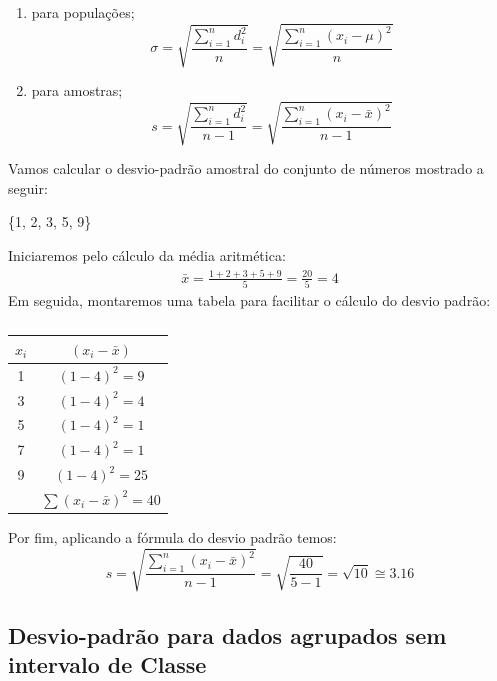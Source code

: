 \begin{enumerate}[label=\alph*.]
    \item para populações;
\[
\sigma=\sqrt{\frac{\sum_{i=1}^{n}d_i^2}{n}}
=\sqrt{\frac{\sum_{i=1}^{n}(x_i-\mu)^2}{n}}
\]
    \item para amostras;
\[
s=\sqrt{\frac{\sum_{i=1}^{n}d_i^2}{n-1}}
=\sqrt{\frac{\sum_{i=1}^{n}(x_i-\bar{x})^2}{n-1}}
\]
\end{enumerate}

\begin{example}
    Vamos calcular o desvio-padrão amostral do conjunto de números mostrado a seguir:
    \begin{center}
        \{1, 2, 3, 5, 9\}
    \end{center}
    Iniciaremos pelo cálculo da média aritmética:
    \begin{align*}
        \bar{x}=\frac{1+2+3+5+9}{5}=\frac{20}{5}=4
    \end{align*}
    Em seguida, montaremos uma tabela para facilitar o cálculo do desvio padrão:

    \begin{table}[ht]
        \centering
            \begin{tabular}{cc}
                \toprule
            $x_i$& $(x_i-\bar{x})$ \\
            \midrule
            1 & \((1-4)^2=9\) \\
            3 & \((1-4)^2=4\) \\
            5 & \((1-4)^2=1\) \\
            7 & \((1-4)^2=1\) \\
            9 & \((1-4)^2=25\)\\
            \midrule 
              & \(\sum (x_i-\bar{x})^2=40\)\\
                \bottomrule
            \end{tabular}
        \caption{}
        \label{tab:despav_amost}
        \end{table}
    Por fim, aplicando a fórmula do desvio padrão temos:
\[
    s=\sqrt{\frac{\sum_{i=1}^{n}(x_i-\bar{x})^2}{n-1}}=\sqrt{\frac{40}{5-1}}=\sqrt{10}\cong3.16
\]
    \end{example}
\subsection{Desvio-padrão para dados agrupados sem intervalo de Classe}

